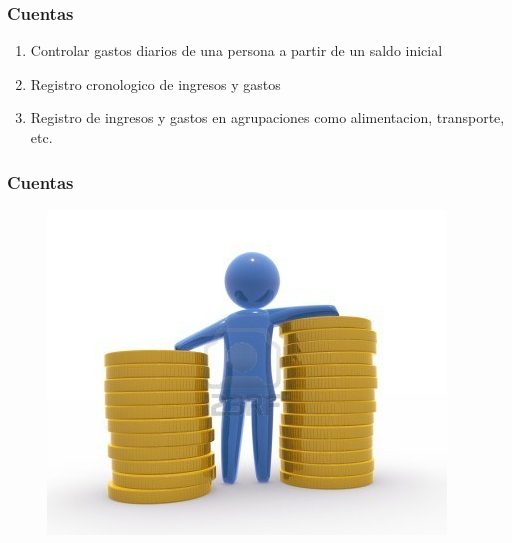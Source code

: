 \documentclass{beamer}
\begin{document}
\begin{frame}[allowframbreaks]
\frametitle{Cuentas}
\begin{enumerate}
\item Controlar gastos diarios de una persona a partir de un saldo inicial
\item Registro cronologico de ingresos y gastos
\item Registro de ingresos y gastos en agrupaciones como alimentacion, transporte, etc.
\end{enumerate}
\end{frame}

\begin{frame}[allowframbreaks]
\frametitle{Cuentas}
\begin{figure}[h]
\centering
\includegraphics[height=0.5\textheight]{control.jpg}
\end{figure}
\end{frame}
\end{document}
